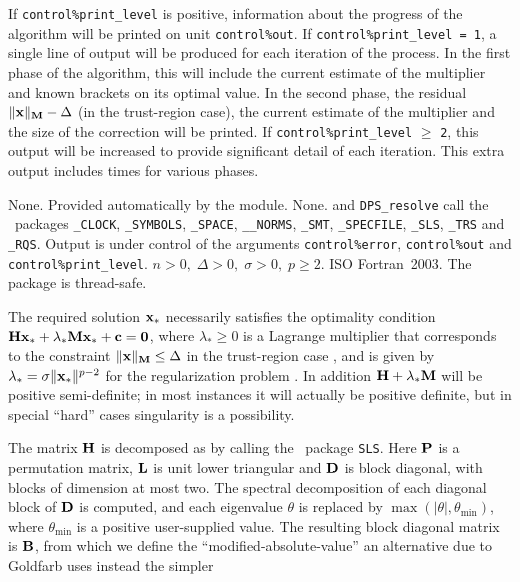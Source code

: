 \documentclass{galahad}
\newcommand{\packagename}{DPS}
\begin{document}

\galinfo
If {\tt control\%print\_level} is positive, information about the progress
of the algorithm will be printed on unit {\tt control\-\%\-out}.
If {\tt control\%print\_level = 1}, a single line of output will be produced
for each iteration of the process. In the first phase of the algorithm,
this will include the current estimate of the multiplier and known
brackets on its optimal value. In the second phase, the residual
$\|{\mathbf{x}}\|_{{\mathbf{M}}} - \Delta$ (in the trust-region case), the current
estimate of the multiplier and the size of the correction will be printed.
If {\tt control\%print\_level} $\geq$ {\tt 2}, this
output will be increased to provide significant detail of each iteration.
This extra output includes times for various phases.


\galgeneral

\galcommon None.
\galworkspace Provided automatically by the module.
\galroutines None.
\galmodules {\tt \packagename\_solve} and {\tt \packagename\_resolve}
call the \galahad\ packages
{\tt \libraryname\_CLOCK},
{\tt \libraryname\_SY\-M\-BOLS},
{\tt \libraryname\_\-SPACE},
{\tt \libraryname\_\_\-NORMS},
{\tt \libraryname\-\_SMT},
{\tt \libraryname\_SPECFILE},
{\tt \libraryname\_SLS},
{\tt \libraryname\_TRS}
and
{\tt \libraryname\_RQS}.
\galio Output is under control of the arguments
{\tt control\%error}, {\tt control\%out} and {\tt control\%print\_level}.
\galrestrictions $n  >  0, \;  \Delta  >  0, \;  \sigma  >  0, \;  p  \geq  2$.
\galportability ISO Fortran~2003.
The package is thread-safe.


\galmethod
The required solution ${\mathbf{x}}_*$ necessarily satisfies the optimality condition
${\mathbf{H}} {\mathbf{x}}_* + \lambda_* {\mathbf{M}} {\mathbf{x}}_* + {\mathbf{c}} = {\mathbf{0}}$,
where $\lambda_* \geq 0$ is a Lagrange
multiplier that corresponds to the constraint
$\|{\mathbf{x}}\|_{{\mathbf{M}}}  \leq  \Delta$ in the trust-region case ,
and is given by $\lambda_* = \sigma \|{\mathbf{x}}_*\|^{p-2}$
for the regularization problem .
In addition ${\mathbf{H}} + \lambda_* {\mathbf{M}}$ will be positive semi-definite; in
most instances it will actually be positive definite, but in special
``hard'' cases singularity is a possibility.

The matrix ${\mathbf{H}}$ is decomposed as
by calling the \galahad\ package {\tt SLS}.
Here ${\mathbf{P}}$ is a permutation matrix,
${\mathbf{L}}$ is unit lower triangular and ${\mathbf{D}}$ is block diagonal, with
blocks of dimension at most two. The spectral decomposition of each diagonal
block of ${\mathbf{D}}$ is computed, and each eigenvalue $\theta$ is replaced by
$\max ( | \theta | , \theta_{\min} ) $,
where $\theta_{\min}$ is a positive user-supplied value. The resulting block
diagonal matrix is ${\mathbf{B}}$, from which we define the ``modified-absolute-value''
an alternative due to Goldfarb uses instead the simpler
\end{document}
